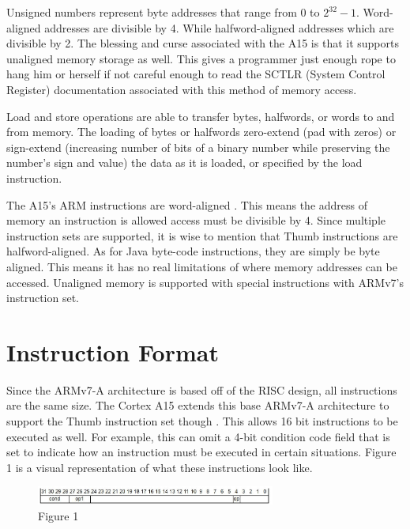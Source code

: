 \documentclass[12pt]{scrreprt}
\begin{document}
	Unsigned numbers represent byte addresses that range from 0 to $2^{32}-1$.
	Word-aligned addresses are divisible by 4.
	While halfword-aligned addresses which are divisible by 2.
	The blessing and curse associated with the A15 is that it supports unaligned memory storage as well.
	This gives a programmer just enough rope to hang him or herself if not careful enough to read the SCTLR (System Control Register) documentation associated with this method of memory access.

	Load and store operations are able to transfer bytes, halfwords, or words to and from memory.
	The loading of bytes or halfwords zero-extend (pad with zeros) or sign-extend (increasing number of bits of a binary number while preserving the number's sign and value) the data as it is loaded, or specified by the load instruction.

	The A15's ARM instructions are word-aligned .
	This means the address of memory an instruction is allowed access must be divisible by 4.
	Since multiple instruction sets are supported, it is wise to mention that Thumb instructions are halfword-aligned.
	As for Java byte-code instructions, they are simply be byte aligned.
	This means it has no real limitations of where memory addresses can be accessed.
	Unaligned memory is supported with special instructions with ARMv7's instruction set.

{\let\clearpage\relax\chapter{Instruction Format}}

	Since the ARMv7-A architecture is based off of the RISC design, all instructions are the same size.
	The Cortex A15 extends this base ARMv7-A architecture to support the Thumb instruction set though \autocite[3-2]{a15man}.
	This allows 16 bit instructions to be executed as well.
	For example, this can omit a 4-bit condition code field that is set to indicate how an instruction must be executed in certain situations.
	Figure 1 is a visual representation of what these instructions look like.
	
	\begin{figure}[h]
		\centering
			\includegraphics[width=0.7\textwidth]{croppedIE}
		\caption{Figure 1}
	\end{figure}
\end{document}
